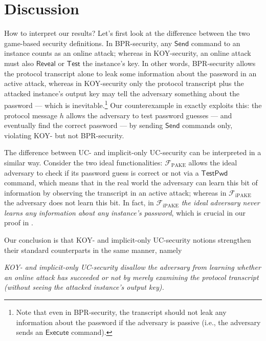 \documentclass{article}
\newcommand{\func}{\mathcal{F}}
\newcommand{\Fpake}{\func_\mathrm{PAKE}}
\newcommand{\Fipake}{\func_\mathrm{iPAKE}}
\newcommand{\TestPwd}{\mathsf{TestPwd}}
\newcommand{\Execute}{\mathsf{Execute}}
\newcommand{\Send}{\mathsf{Send}}
\newcommand{\Reveal}{\mathsf{Reveal}}
\newcommand{\Test}{\mathsf{Test}}
\begin{document}
\section{Discussion}
\label{sec:conclusion}
How to interpret our results? Let's first look at the difference between the two game-based security definitions. In BPR-security, any $\Send$ command to an instance counts as an online attack; whereas in KOY-security, an online attack must also $\Reveal$ or $\Test$ the instance's key. In other words, BPR-security allows the protocol transcript alone to leak some information about the password in an active attack, whereas in KOY-security only the protocol transcript {\color{blue}plus the attacked instance's output key} may tell the adversary something about the password --- which is inevitable.\footnote{Note that even in BPR-security, the transcript should not leak any information about the password if the adversary is passive (i.e., the adversary sends an $\Execute$ command).} Our counterexample in  exactly exploits this: the protocol message $h$ allows the adversary to test password guesses --- and eventually find the correct password --- by sending $\Send$ commands only, violating KOY- but not BPR-security.

The difference between UC- and implicit-only UC-security can be interpreted in a similar way. Consider the two ideal functionalities: $\Fpake$ allows the ideal adversary to check if its password guess is correct or not via a $\TestPwd$ command, which means that in the real world the adversary can learn this bit of information by observing the transcript in an active attack; whereas in $\Fipake$ the adversary does not learn this bit. In fact, in $\Fipake$ \emph{the ideal adversary never learns any information about any instance's password}, which is crucial in our proof in .

Our conclusion is that KOY- and implicit-only UC-security notions strengthen their standard counterparts in the same manner, namely
\begin{framed}
\begin{displayquote}
  \emph{KOY- and implicit-only UC-security disallow the adversary from learning whether an online attack has succeeded or not by merely examining the protocol transcript (without seeing the attacked instance's output key).}
\end{displayquote}
\end{framed}
\end{document}
